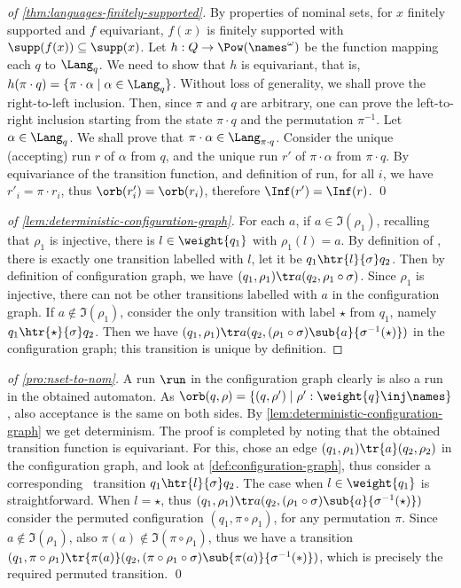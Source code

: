 

\begin{proof}[of \cref{thm:languages-finitely-supported}]
By properties of nominal sets, for $x$ finitely supported and $f$ equivariant, $f(x)$ is finitely supported with $\supp(f(x))\subseteq \supp(x)$. Let $h : Q \to \Pow(\names^\omega)$ be the function mapping each $q$ to $\Lang_q$. We need to show that $h$ is equivariant, that is, $h(\pi \cdot q) = \{ \pi \cdot \alpha \mid \alpha \in \Lang_q\}$. Without loss of generality, we shall prove the right-to-left inclusion. Then, since $\pi$ and $q$ are arbitrary, one can prove the left-to-right inclusion starting from the state $\pi \cdot q$ and the permutation $\pi^{-1}$. Let $\alpha \in \Lang_q$. We shall prove that $\pi\cdot\alpha \in \Lang_{\pi\cdot q}$. Consider the unique (accepting) run $r$ of $\alpha$ from $q$, and  the unique run $r'$ of $\pi \cdot \alpha$ from $\pi \cdot q$. By equivariance of the transition function, and definition of run, for all $i$, we have $r'_i = \pi \cdot r_i$, thus $\orb(r'_i)=\orb(r_i)$, therefore $\Inf(r')= \Inf(r)$. 
\qed 
\end{proof}
\begin{proof}[of \cref{lem:deterministic-configuration-graph}]
 For each $a$, if $a \in \Im(\rho_1)$, recalling that $\rho_1$ is injective, there is $l \in \weight{q_1}$ with $\rho_1(l) = a$. By definition of \hdma, there is exactly one transition labelled with $l$, let it be $q_1 \htr{l}{\sigma} q_2$. Then by definition of configuration graph, we have $(q_1,\rho_1) \tr a (q_2,\rho_1 \circ \sigma)$. Since $\rho_1$ is injective, there can not be other transitions labelled with $a$ in the configuration graph. If $a \notin \Im(\rho_1)$, consider the only transition with label $\star$ from $q_1$, namely $q_1 \htr{\star}{\sigma} q_2$.  Then we have $(q_1,\rho_1) \tr a (q_2,(\rho_1 \circ \sigma)\sub{a}{\sigma^{-1}(\star)})$ in the configuration graph; this transition is unique by definition.
\end{proof}

\begin{proof}[of \cref{pro:nset-to-nom}]
 A run $\run$ in the configuration graph clearly is also a run in the obtained automaton. As $\orb(q,\rho) = \{(q,\rho')\mid \rho' : \weight{q} \inj \names \}$, also acceptance is the same on both sides. By \cref{lem:deterministic-configuration-graph} we get determinism. The proof is completed by noting that the obtained transition function is equivariant. For this, chose an edge $(q_1,\rho_1) \tr{a} (q_2,\rho_2)$ in the configuration graph, and look at \cref{def:configuration-graph}, thus consider a corresponding \hdma\ transition $q_1 \htr{l}{\sigma} q_2$. The case when $l \in \weight{q_1}$ is straightforward. When $l=\star$, thus $(q_1,\rho_1) \tr a (q_2,(\rho_1 \circ \sigma)\sub{a}{\sigma^{-1}(\star)})$ consider the permuted configuration $(q_1,\pi\circ\rho_1)$,  for any permutation $\pi$. Since $a \notin \Im(\rho_1)$, also  $\pi(a) \notin \Im (\pi\circ\rho_1)$, thus we have a transition $(q_1,\pi\circ\rho_1)\tr{\pi(a)}(q_2,(\pi \circ \rho_1\circ \sigma)\sub{\pi(a)}{\sigma^{-1}(*)})$, which is precisely the required permuted transition. \qed
\end{proof}



